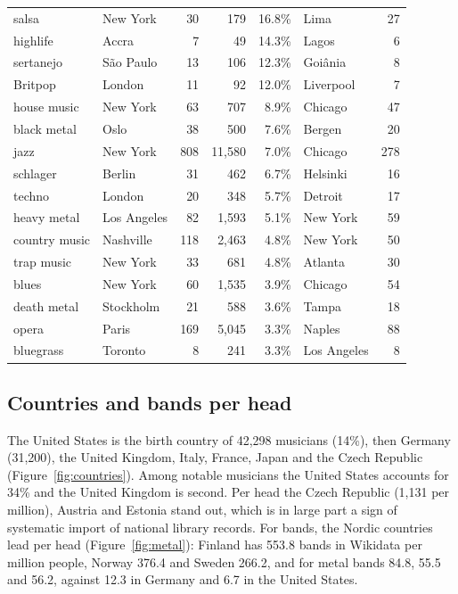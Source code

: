\documentclass[11pt,a4paper]{article}
\begin{document}
\begin{table}[tbp]
\begin{tabular}{llrrrlr}
salsa & New York & 30 & 179 & 16.8\% & Lima & 27\\
highlife & Accra & 7 & 49 & 14.3\% & Lagos & 6\\
sertanejo & São Paulo & 13 & 106 & 12.3\% & Goiânia & 8\\
Britpop & London & 11 & 92 & 12.0\% & Liverpool & 7\\
house music & New York & 63 & 707 & 8.9\% & Chicago & 47\\
black metal & Oslo & 38 & 500 & 7.6\% & Bergen & 20\\
jazz & New York & 808 & 11,580 & 7.0\% & Chicago & 278\\
schlager & Berlin & 31 & 462 & 6.7\% & Helsinki & 16\\
techno & London & 20 & 348 & 5.7\% & Detroit & 17\\
heavy metal & Los Angeles & 82 & 1,593 & 5.1\% & New York & 59\\
country music & Nashville & 118 & 2,463 & 4.8\% & New York & 50\\
trap music & New York & 33 & 681 & 4.8\% & Atlanta & 30\\
blues & New York & 60 & 1,535 & 3.9\% & Chicago & 54\\
death metal & Stockholm & 21 & 588 & 3.6\% & Tampa & 18\\
opera & Paris & 169 & 5,045 & 3.3\% & Naples & 88\\
bluegrass & Toronto & 8 & 241 & 3.3\% & Los Angeles & 8\\
\bottomrule\end{tabular}\end{table}

\subsection{Countries and bands per head}
The United States is the birth country of 42,298 musicians (14\%), then Germany (31,200), the United Kingdom, Italy, France, Japan and the Czech Republic (Figure~\ref{fig:countries}). Among notable musicians the United States accounts for 34\% and the United Kingdom is second. Per head the Czech Republic (1,131 per million), Austria and Estonia stand out, which is in large part a sign of systematic import of national library records. For bands, the Nordic countries lead per head (Figure~\ref{fig:metal}): Finland has 553.8 bands in Wikidata per million people, Norway 376.4 and Sweden 266.2, and for metal bands 84.8, 55.5 and 56.2, against 12.3 in Germany and 6.7 in the United States.
\end{document}
